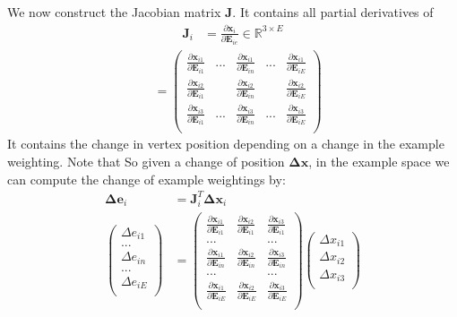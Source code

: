 We now construct the Jacobian matrix $\bm J$. It contains all partial derivatives of 
\begin{align}
\bm J_i &= \frac{\partial\bm x_i}{\partial \bm E_{ie}} \in \mathbb{R}^{3\times E}
\end{align}
\begin{align}
&=
\begin{pmatrix}
\frac{\partial\bm x_{i1}}{\partial \bm E_{i1}} &...&\frac{\partial\bm x_{i1}}{\partial \bm E_{in}} &...&\frac{\partial\bm x_{i1}}{\partial \bm E_{iE}} \\
\frac{\partial\bm x_{i2}}{\partial \bm E_{i1}}&&\frac{\partial\bm x_{i2}}{\partial \bm E_{in}}&&\frac{\partial\bm x_{i2}}{\partial \bm E_{iE}}\\
\frac{\partial\bm x_{i3}}{\partial \bm E_{i1}} &...&\frac{\partial\bm x_{i3}}{\partial \bm E_{in}} &...&\frac{\partial\bm x_{i3}}{\partial \bm E_{iE}} \\
\end{pmatrix}
\end{align}
It contains the change in vertex position depending on a change in the example weighting. Note that 
So given a change of position $\bm{\Delta x}$, in the example space we can compute the change of example weightings by:
\begin{align}
\bm{\Delta e}_i &= \bm J_i^T \bm{\Delta x}_i\\
\begin{pmatrix}
\Delta e_{i1} \\
...\\
\Delta e_{in} \\
...\\
\Delta e_{iE} \\
\end{pmatrix}
&=
\begin{pmatrix}
\frac{\partial\bm x_{i1}}{\partial \bm E_{i1}} &\frac{\partial\bm x_{i2}}{\partial \bm E_{i1}}&\frac{\partial\bm x_{i3}}{\partial \bm E_{i1}}\\
...&&...\\
\frac{\partial\bm x_{i1}}{\partial \bm E_{in}}&\frac{\partial\bm x_{i2}}{\partial \bm E_{in}}&\frac{\partial\bm x_{i3}}{\partial \bm E_{in}}\\
...&&...\\
\frac{\partial\bm x_{i1}}{\partial \bm E_{iE}}&\frac{\partial\bm x_{i2}}{\partial \bm E_{iE}}&\frac{\partial\bm x_{i3}}{\partial \bm E_{iE}}\\
\end{pmatrix}
\begin{pmatrix}
\Delta x_{i1}\\
\Delta x_{i2}\\
\Delta x_{i3}\\
\end{pmatrix}
\end{align}
